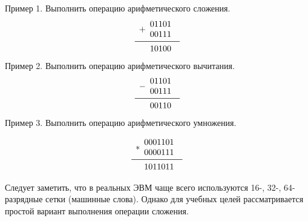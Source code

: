 \documentclass[a4paper]{article}
\begin{document}
\begin{center}

Пример 1. Выполнить операцию арифметического сложения.
\[
\begin{array}{r}
+
\begin{array}{r}
01101\\
00111\\
\end{array} \\
\midrule
\begin{array}{r}
10100
\end{array}
\end{array}
\]
Пример 2. Выполнить операцию арифметического вычитания.
\[
\begin{array}{r}
-
\begin{array}{r}
01101\\
00111\\
\end{array} \\
\midrule
\begin{array}{r}
00110
\end{array}
\end{array}
\]
Пример 3. Выполнить операцию арифметического умножения.

\[
\begin{array}{r}
*
\begin{array}{r}
0001101\\
0000111\\
\end{array} \\
\midrule
\begin{array}{r}
1011011
\end{array}
\end{array}
\]

\end{center}

Следует заметить, что в реальных ЭВМ чаще всего используются 16-, 32-, 64-разрядные сетки (машинные слова). Однако для учебных целей рассматривается простой вариант выполнения операции сложения.
\end{document}
